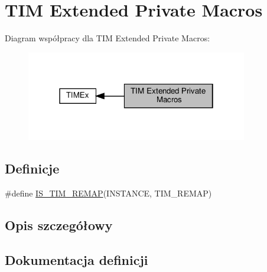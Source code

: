 \hypertarget{group___t_i_m_ex___private___macros}{}\section{T\+IM Extended Private Macros}
\label{group___t_i_m_ex___private___macros}
Diagram współpracy dla T\+IM Extended Private Macros\+:\nopagebreak
\begin{figure}[H]
\begin{center}
\leavevmode
\includegraphics[width=274pt]{group___t_i_m_ex___private___macros}
\end{center}
\end{figure}
\subsection*{Definicje}
\begin{DoxyCompactItemize}
\item 
\#define \hyperlink{group___t_i_m_ex___private___macros_gaeedfcda4bf88568f27112e5378ad9183}{I\+S\+\_\+\+T\+I\+M\+\_\+\+R\+E\+M\+AP}(I\+N\+S\+T\+A\+N\+CE,  T\+I\+M\+\_\+\+R\+E\+M\+AP)
\end{DoxyCompactItemize}


\subsection{Opis szczegółowy}


\subsection{Dokumentacja definicji}
\mbox{\label{group___t_i_m_ex___private___macros_gaeedfcda4bf88568f27112e5378ad9183}} 
